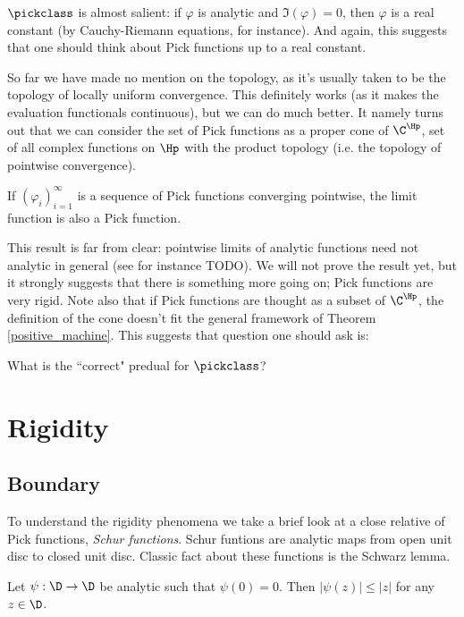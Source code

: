 $\pickclass$ is almost salient: if $\varphi$ is analytic and $\Im(\varphi) = 0$, then $\varphi$ is a real constant (by Cauchy-Riemann equations, for instance). And again, this suggests that one should think about Pick functions up to a real constant.

So far we have made no mention on the topology, as it's usually taken to be the topology of locally uniform convergence. This definitely works (as it makes the evaluation functionals continuous), but we can do much better. It namely turns out that we can consider the set of Pick functions as a proper cone of $\C^{\Hp}$, set of all complex functions on $\Hp$ with the product topology (i.e. the topology of pointwise convergence).

\begin{prop}\label{pick_convergence}
	If $(\varphi_{i})_{i = 1}^{\infty}$ is a sequence of Pick functions converging pointwise, the limit function is also a Pick function.
\end{prop}

This result is far from clear: pointwise limits of analytic functions need not analytic in general (see for instance TODO). We will not prove the result yet, but it strongly suggests that there is something more going on; Pick functions are very rigid. Note also that if Pick functions are thought as a subset of $\C^{\Hp}$, the definition of the cone doesn't fit the general framework of Theorem \ref{positive_machine}. This suggests that question one should ask is:

\begin{quest}\label{pick_predual}
	What is the ``correct" predual for $\pickclass$?
\end{quest}


\section{Rigidity}

\subsection{Boundary}

To understand the rigidity phenomena we take a brief look at a close relative of Pick functions, \textit{Schur functions}. Schur funtions are analytic maps from open unit disc to closed unit disc. Classic fact about these functions is the Schwarz lemma.

\begin{lause}
	Let $\psi : \D \to \D$ be analytic such that $\psi(0) = 0$. Then $|\psi(z)| \leq |z|$ for any $z \in \D$.
\end{lause}

